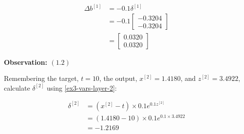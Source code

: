 \documentclass[12pt]{article}
\begin{document}
\begin{enumerate}[leftmargin=\labelsep]
\begin{paracol}{3}
\begin{footnotesize}
                  $$
                      \begin{aligned}
                          \Delta b^{[1]} & = -0.1 \delta^{[1]}   \\
                                         & = -0.1 \begin{bmatrix}
                                                      -0.3204 \\
                                                      -0.3204
                                                  \end{bmatrix} \\
                                         & = \begin{bmatrix}
                                                 0.0320 \\
                                                 0.0320
                                             \end{bmatrix}
                      \end{aligned}
                  $$
              \end{footnotesize}

              \switchcolumn

              \begin{center}
                  \textbf{Observation: $(1.2)$}
              \end{center}

              Remembering the target, $t = 10$,
              the output, $x^{[2]} = 1.4180$,
              and $z^{[2]} = 3.4922$,
              calculate $\delta^{[2]}$ using \eqref{ex3-vars-layer-2}:

              \begin{footnotesize}
                  $$
                      \begin{aligned}
                          \delta^{[2]} & = \left(x^{[2]} - t\right) \times 0.1 e^{0.1 z^{[2]}} \\
                                       & = (1.4180 - 10) \times 0.1 e^{0.1 \times 3.4922}      \\
                                       & = -1.2169
                      \end{aligned}
                  $$
              \end{footnotesize}


\end{paracol}
\end{enumerate}
\end{document}
